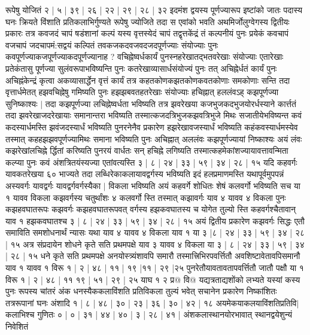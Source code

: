 \documentclass[12pt]{article}
\begin{document}
{रूपेषु योजितं २ | ५ | ३९ | २६ | २२ | २९ | २८ | ३२
इदमंश द्वयस्य पूर्णज्यारूप इष्टांको जातः पदास्य घनः क्रियते विंशाति प्रतिकलाभिर्गुण्यते
रूपेषु ज्योजिते तदा स एवांको भवति अथमिर्जोलुग्वेगस्य द्वितीयः प्रकारः तत्र कवजदं चापं षडंशानां कल्पं
यस्य वृत्तस्येदं चापं तद्वृत्तकेंद्रं तं कल्पनीयं पुनः प्रयेकं कवचापं वजचापं जदचापमं:सद्वयं कल्पितं
तवकजकदवजवदजदपूर्णज्याः संयोज्याः पुनः कवपूर्णज्याकजपूर्णज्याकदपूर्णज्यानाह ?
वचिह्नेष्वर्धकार्यं पुनस्नहरेखातद्भतवरेखाः संयोज्याः एतारेखाः प्रतेकंतासु पूर्णज्या सुलंवरूपाभविष्यन्ति पुनः कतरेखाव्यासार्धसंयोज्यं पुनः तत् अचिह्नेर्धतं कार्यं पुनः अचिह्नंकेन्द्रं कृत्वा
अकव्यासार्द्धेन वृत्तं कार्यं तत्र कहतकोणकझतकोणकवतकोणाः समकोणाः सन्ति तदा वृत्तार्धमेतत् हझवचिह्नेषु गमिष्यति पुनः हझझबवतहतरेखाः संयोज्याः हचिह्नात् हललंवऽह् कझपूर्णज्या सुनिष्काश्यः $|$
तदा कझपूर्णज्या लचिह्नेष्वर्धता भविष्यति तत्र झवरेखया कजभुजकदभुजयोरर्धस्याने कार्त्ततं तदा झवरेखा\-जदरेखायाः समानान्तरा भविष्यति तस्मात्कजदत्रिभुजकझवत्रिभुजे मिथः सजातीयेभविष्यन्त कवं कदस्यार्धमस्ति झवंजदस्यार्धं भविष्यति
पुनरनेनैव प्रकारेण हझरेखावजस्यार्धं भविष्यति कहंकवस्यार्धमस्येव तस्मात् कहहझझवपूर्णज्यामिथः समाना भविष्यति
पुनः अचिह्नात् अललंवः कझपूर्णज्यायां निष्काश्यः अयं लंवः कझरेखांलचिह्ने र्द्धितां करिष्यति
पुनरयं वार्धतः सन् हचिह्ने लगिष्यति तस्मात्कहमेकांशज्यायावत्तावन्मिता कल्प्या पुनः कवं अंशत्रितयंस्यज्या एतांवत्यस्ति ३ | ८ | २४ | ३३ | ५९ | ३४ | २८ | १५
यदि कहवर्गः यावकतरेखया ६० भाज्यते तदा लब्धिरेकाकलायावद्वर्गस्य भविष्यति इदं हलप्रमाणमस्ति यथापूर्वमुपपन्नं अस्यवर्गः यावद्वर्गः यावद्वर्गवर्गस्यैका $|$
विकला भविष्यति अयं कहवर्गे शोधितः शेषं कलवर्गो भविष्यति सच या १ यावव विकला कझवर्गस्य चतुर्थांशः ४
कलवर्गो स्ति तस्मात् कझावर्गः याव ४ यावव ४ विकला पुनः कझहवघातरूपः
कझवर्गः कझहवघातरूपवत् वर्गस्य हझकवघातस्य च योगेत तुल्यो स्ति
कहवर्गश्चैतावान् याव १ हझकवघातश्च ३ | ८ | २४ | ३३ | ५९ | ३४ | २८ | १५ अयं
द्वितीय प्रकारेण कझवर्गः सिद्धः एतौ समाविति समशोधनार्थं न्यासः
यथा याव ४ यावव ४ विकला याव १ या ३ |८ | २४ | ३३ | ५९ | ३४ | २८ | १५ अत्र
संप्रदायेन शोधने कृते सति प्रथमपक्षे याव ३ यावव ४ विकला या ३ | ८ | २४ |
३३ | ५९ | ३४ | २८ | १५ धने कृते सति प्रथमपक्षे अनयोस्त्र्यंशावपि समारौ
तस्मात्त्रिभिरपवर्त्तितौ अवशिष्टावेतावपिसमानौ याव १ यावव १ विरू १ | २ | ४८ | ११ |
१९ |११ | २९ |२५
पुनरेतौयावतावतापवर्त्तितौ जातौ पक्षौ या १ विरू १ | २ | ४८ | ११ १९ | ५१ | २९ | २५ याघ १ २ प्र@ वि@
यद्यत्रताद्यशोंको लभ्यते यस्यां कस्य पुनः रूपस्य चांतरं अंक धनस्यैककलाविंशति प्रतिविकला तुल्यं भवेत्
सचानेन प्रकारेण निष्कांशितः तत्ररूपानां घनः अंशादि १ | ८ | ४८ | ३० | २३ | ३६ | ३० | ४२ | १८ अयमेकयाकलयाविंशतिप्रतिवि$|$ कलाभिश्च गुणितः ० | ० | ३१ | ४४ | ४० | ३ | २८ | ४१ | अंशकलास्थानयोरभावात् स्थानद्वयेशुन्यं निवेशितं
}
\end{document}
